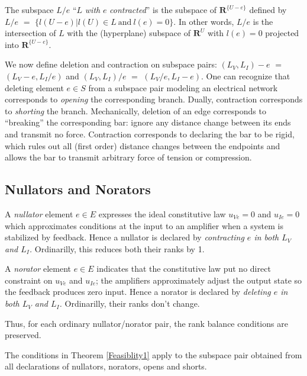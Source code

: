 \documentclass{article}
\def\Reals{\ensuremath{\mathbf R}}
\begin{document}
The subspace $L/e$ ``$L$ \textit{with} $e$ \textit{contracted}'' is the 
subspace
of $\Reals^{\{U-e\}}$ defined by 
$L/e$ $=$
$\{ l(U-e) | l(U)\in L \mathrm{\ and\ } l(e)=0\}$.  
In other words, $L/e$ is the 
intersection of $L$ with
the (hyperplane) subspace of $\Reals^U$ with $l(e)=0$ 
projected into 
$\Reals^{\{U-e\}}$.

We now define deletion and contraction on subspace pairs:  
$(L_V, L_I)-e$ $=$ $(L_V-e, L_I/e)$ and 
$(L_V, L_I)/e$ $=$ $(L_V/e, L_I-e)$.  One can recognize that 
deleting element $e\in S$ from a subspace pair modeling an electrical network
corresponds to \textit{opening} the corresponding branch.  Dually, 
contraction corresponds to \textit{shorting} the branch.  Mechanically,
deletion of an edge corresponds to ``breaking'' the corresponding bar:
ignore any distance change between its ends and transmit no force.
Contraction corresponds to 
declaring the bar to be rigid, which rules out 
all (first order) distance changes between the endpoints and allows 
the bar 
to transmit arbitrary force of tension or compression.

\subsection{Nullators and Norators}
A \textit{nullator} element $e\in E$ 
expresses the ideal constitutive law $u_{Ve}=0$
and $u_{Ie}=0$ which approximates conditions at the input
to an amplifier when a system is stabilized by feedback.
Hence a nullator is declared by 
\textit{contracting $e$ in both
$L_V$ and $L_I$.}  Ordinarilly, this reduces both their ranks by 1.

A \textit{norator} element $e\in E$ indicates that the constitutive
law put no direct constraint on $u_{Ve}$ and $u_{Ie}$; the amplifiers
approximately adjust the output state so the feedback produces zero input.
Hence a norator is declared by 
\textit{deleting $e$ in both
$L_V$ and $L_I$.}  Ordinarilly, their ranks don't change.

Thus, for each ordinary nullator/norator pair, the rank balance conditions
are preserved.  

The conditions in Theorem \ref{Feasiblity1} apply to the subspace pair
obtained from all declarations of nullators, norators, opens and shorts.
\end{document}
